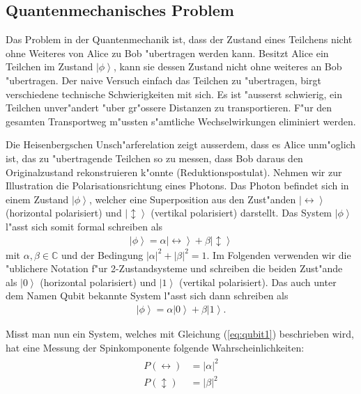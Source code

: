 \begin{refsection}
\subsection{Quantenmechanisches Problem}
Das Problem in der Quantenmechanik ist, dass der Zustand eines Teilchens nicht ohne Weiteres von Alice zu Bob "ubertragen werden kann. Besitzt Alice ein Teilchen im Zustand $\left|\phi\right\rangle$, kann sie dessen Zustand nicht ohne weiteres an Bob "ubertragen. Der naive Versuch einfach das Teilchen zu "ubertragen, birgt verschiedene technische Schwierigkeiten mit sich. Es ist "ausserst schwierig, ein Teilchen unver"andert "uber gr"ossere Distanzen zu transportieren. F"ur den gesamten Transportweg m"ussten s"amtliche Wechselwirkungen eliminiert werden. 

Die Heisenbergschen Unsch"arferelation zeigt ausserdem, dass es Alice unm"oglich ist, das zu "ubertragende Teilchen so zu messen, dass Bob daraus den Originalzustand rekonstruieren k"onnte (Reduktionspostulat). Nehmen wir zur Illustration die Polarisationsrichtung eines Photons. Das Photon befindet sich in einem Zustand $\left|\phi\right\rangle$, welcher eine Superposition aus den Zust"anden $\left|\leftrightarrow\right\rangle$ (horizontal polarisiert) und $\left|\updownarrow\right\rangle$ (vertikal polarisiert) darstellt. Das System $\left|\phi\right\rangle$ l"asst sich somit formal schreiben als
\begin{align}\label{eq:qubit1}
\left|\phi\right\rangle = \alpha\left|\leftrightarrow\right\rangle + \beta\left|\updownarrow\right\rangle 
\end{align}
mit $\alpha, \beta \in \mathbb{C}$ und der Bedingung $\left|\alpha\right|^{2} + \left|\beta\right|^{2} = 1$. Im Folgenden verwenden wir die "ublichere Notation f"ur 2-Zustandsysteme und schreiben die beiden Zust"ande als $\left| 0 \right\rangle$ (horizontal polarisiert) und $\left| 1 \right\rangle$ (vertikal polarisiert). Das auch unter dem Namen Qubit bekannte System l"asst sich dann schreiben als 
\begin{align}\label{eq:qubit2}
\left|\phi\right\rangle = \alpha\left|0\right\rangle + \beta\left|1\right\rangle.
\end{align}

Misst man nun ein System, welches mit Gleichung (\ref{eq:qubit1}) beschrieben wird, hat eine Messung der Spinkomponente folgende Wahrscheinlichkeiten:
\begin{align}
	\begin{split}
		P\left(\leftrightarrow\right) & =\left|\alpha\right|^2  \\
	    P\left(\updownarrow\right) & =\left|\beta\right|^2
	\end{split}
\end{align}


\end{refsection}
